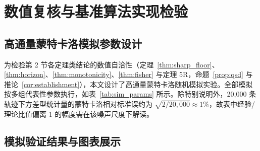 \documentclass[10pt,a4paper]{article}
\theoremstyle{plain}
\theoremstyle{definition}
\begin{document}
\section{数值复核与基准算法实现检验}\label{sec:simulation}

\subsection{高通量蒙特卡洛模拟参数设计}

为检验第 2 节各定理类结论的数值自洽性（定理~\ref{thm:sharp_floor}、\ref{thm:horizon}、\ref{thm:monotonicity}、\ref{thm:fisher} 与定理 5R，命题~\ref{prop:qsd} 与推论~\ref{cor:establishment}），本文设计了高通量蒙特卡洛随机模拟实验。全部模拟按多组代表性参数执行，如表~\ref{tab:sim_params} 所示。除特别说明外，20,000 条轨迹下方差型统计量的蒙特卡洛相对标准误约为 $\sqrt{2/20{,}000} \approx 1\%$，故表中经验/理论比值偏离 1 的幅度需在该噪声尺度下解读。



\subsection{模拟验证结果与图表展示}
\end{document}
